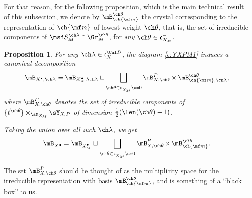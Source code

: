 \documentclass[final]{amsart}
\newtheorem{prop}[subsubsection]{Proposition}
\theoremstyle{remark}
\theoremstyle{definition}
\DeclareMathOperator*{\xt}{\times}
\numberwithin{equation}{section}
\begin{document}
For that reason, for the following proposition, which is the main technical result of this subsection, we denote by $\mB^{\ch\theta}_{\ch{\mf m}}$ the crystal corresponding to the representation of $\ch{\mf m}$ of lowest weight $\ch\theta$, that is, the set of irreducible components of $\msf S_M^{\ch\lambda} \cap \Gr_M^{\ch\theta} $, for \emph{any} $\ch\theta\in \mathfrak c_{X_M}^-$.

\begin{prop}\label{prop:crys-decomp}
For any $\ch\lambda\in \mathfrak c_X^{\Cal D}$, the diagram \eqref{e:YXPM1} induces a canonical decomposition
\begin{equation} \label{e:crys-decomp}
    \mB_{X^\bullet,\ch\lambda} = \mB_{X_M^\bullet,\ch\lambda} \sqcup 
        \bigsqcup_{\ch\theta \in \mathfrak c_{X_M}^-\sm 0} 
        \mB^P_{X,\ch\theta} \xt \mB_{\ch{\mf m}, \ch\lambda}^{\ch\theta},
\end{equation}
where $\mB^P_{X,\ch\theta}$ denotes the set of irreducible components
of $\{t^{\ch\theta}\} \xt_{\sM_{X_M}} \sY_{X,P}$ of dimension $\frac 1 2 (\len(\ch\theta)-1)$.

Taking the union over all such $\ch\lambda$, we get
\begin{equation}
    \mB_{X^\bullet}^+ = \mB_{X_M^\bullet}^+ \sqcup \bigsqcup_{\ch\theta\in \mathfrak c_{X_M}^-\sm 0} 
    \mB^P_{X,\ch\theta} \xt \mB^{\ch\theta}_{\ch{\mf m}}.
\end{equation}
\end{prop}

The set $\mB^P_{X,\ch\theta}$ should be thought of as the multiplicity space for the irreducible representation with basis $\mB^{\ch\theta}_{\ch{\mf m}}$, and is something of a ``black box'' to us. 
\end{document}
